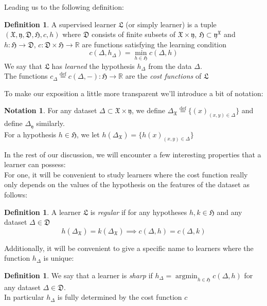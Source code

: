 \documentclass{book}
\theoremstyle{plain}
\theoremstyle{definition}
\newtheorem{definition}[corollary]{Definition}
\newtheorem{notation}{Notation}
\DeclareMathOperator{\argmin}{argmin}
\renewcommand{\d}[1]{\mathbb{#1}}
\newcommand{\define}{\stackrel{\operatorname{def}}{=}}
\newcommand{\f}[1]{\mathfrak{#1}}
\newcommand{\mor}{\longrightarrow}
\begin{document}
\noindent Leading us to the following definition:


\begin{definition}\label{sl:def:supervisedlearner}
A supervised learner  $\f{L}$ (or simply learner) is a tuple $(\f{X},\f{y},\f{D},\f{H},c,h)$ where $\f{D}$ consists of finite subsets of $\f{X}\times \f{y}$,  $\f{H}\subset \f{y}^{\f{X}}$  and $h:\f{H}\mor \f{D}$, $c: \f{D}\times \f{H}\mor \d{R}$ are functions satisfying the learning condition
\[
	c(\Delta,h_\Delta)=\min_{h\in \f{H}} c(\Delta,h)
\]
We say that $\f{L}$ has \emph{learned} the hypothesis $h_\Delta$ from the data $\Delta$.\\
The functions $c_\Delta\define c(\Delta,-): \f{H}\mor \d{R}$ are the \emph{cost functions} of $\f{L}$
\end{definition}
\noindent To make our exposition a little more transparent we'll introduce a bit of notation: 


\begin{notation}\label{not:Delta}
	For any dataset $\Delta \subset \f{X}\times \f{y}$, we define $\Delta_\f{X}\define\big\{(x)_{(x,y)\in \Delta}\big\}$ and define $\Delta_\f{y}$ similarly.\\
	For a hypothesis $h\in \f{H}$, we let $h(\Delta_\f{X})= \big\{h(x)_{(x,y)\in \Delta}\big\}$
\end{notation}

In the rest of our discussion, we will encounter a few interesting properties that a learner can possess:\\ 
\noindent For one, it will be convenient to study learners where the cost function really only depends on the values of the hypothesis on the features of the dataset as follows:


\begin{definition}\label{def:regularlearner}
	A learner $\f{L}$ is \emph{regular} if for any hypotheses $h,k \in \f{H}$ and any dataset $\Delta \in \f{D}$
	\[
	h(\Delta_\f{X})= k(\Delta_\f{X})\implies c(\Delta,h)=c(\Delta,k)
	\]
\end{definition}

Additionally, it will be convenient to give a specific name to learners where the function $h_\Delta$ is unique:
\begin{definition}\label{def:sharp}
We say that a learner is \emph{sharp} if $h_\Delta=\argmin_{h\in \f{H}} c(\Delta,h)$ for any dataset $\Delta \in \f{D}$.\\
 In particular $h_\Delta$ is fully determined by the cost function $c$
\end{definition}
\end{document}
